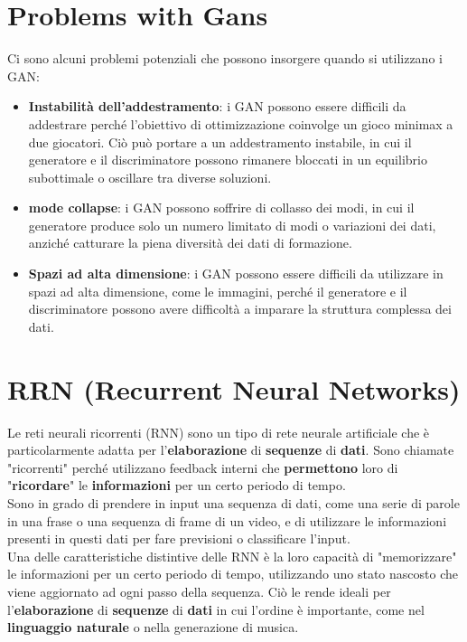 \documentclass{article}
\begin{document}
\section{Problems with Gans}
Ci sono alcuni problemi potenziali che possono insorgere quando si utilizzano i GAN:
\begin{itemize}
    \item \textbf{Instabilità dell'addestramento}: i GAN possono essere difficili da addestrare perché l'obiettivo di ottimizzazione coinvolge un gioco minimax a due giocatori. Ciò può portare a un addestramento instabile, in cui il generatore e il discriminatore possono rimanere bloccati in un equilibrio subottimale o oscillare tra diverse soluzioni.
    \item \textbf{mode collapse}: i GAN possono soffrire di collasso dei modi, in cui il generatore produce solo un numero limitato di modi o variazioni dei dati, anziché catturare la piena diversità dei dati di formazione.
    \item \textbf{Spazi ad alta dimensione}: i GAN possono essere difficili da utilizzare in spazi ad alta dimensione, come le immagini, perché il generatore e il discriminatore possono avere difficoltà a imparare la struttura complessa dei dati.
\end{itemize}





\section{RRN (Recurrent Neural Networks)}
Le reti neurali ricorrenti (RNN) sono un tipo di rete neurale artificiale che è particolarmente adatta per l'\textbf{elaborazione} di \textbf{sequenze} di \textbf{dati}. Sono chiamate "ricorrenti" perché utilizzano feedback interni che \textbf{permettono} loro di "\textbf{ricordare}" le \textbf{informazioni} per un certo periodo di tempo.\\
Sono in grado di prendere in input una sequenza di dati, come una serie di parole in una frase o una sequenza di frame di un video, e di utilizzare le informazioni presenti in questi dati per fare previsioni o classificare l'input.\\
Una delle caratteristiche distintive delle RNN è la loro capacità di "memorizzare" le informazioni per un certo periodo di tempo, utilizzando uno stato nascosto che viene aggiornato ad ogni passo della sequenza. Ciò le rende ideali per l'\textbf{elaborazione} di \textbf{sequenze} di \textbf{dati} in cui l'ordine è importante, come nel \textbf{linguaggio naturale} o nella generazione di musica.
\end{document}
